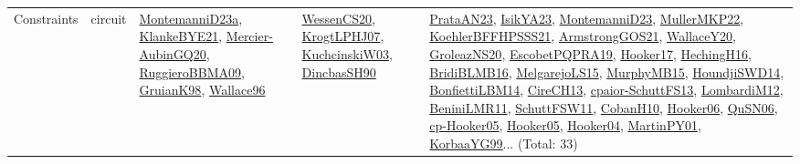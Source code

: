 {\begin{longtable}{lp{3cm}>{\raggedright}p{6cm}>{\raggedright}p{6cm}p{8cm}}
Constraints & circuit & \href{articles/MontemanniD23a.pdf}{MontemanniD23a}\cite{MontemanniD23a}, \href{papers/KlankeBYE21.pdf}{KlankeBYE21}\cite{KlankeBYE21}, \href{papers/Mercier-AubinGQ20.pdf}{Mercier-AubinGQ20}\cite{Mercier-AubinGQ20}, \href{articles/RuggieroBBMA09.pdf}{RuggieroBBMA09}\cite{RuggieroBBMA09}, \href{papers/GruianK98.pdf}{GruianK98}\cite{GruianK98}, \href{articles/Wallace96.pdf}{Wallace96}\cite{Wallace96} & \href{papers/WessenCS20.pdf}{WessenCS20}\cite{WessenCS20}, \href{papers/KrogtLPHJ07.pdf}{KrogtLPHJ07}\cite{KrogtLPHJ07}, \href{articles/KuchcinskiW03.pdf}{KuchcinskiW03}\cite{KuchcinskiW03}, \href{articles/DincbasSH90.pdf}{DincbasSH90}\cite{DincbasSH90} & \href{articles/PrataAN23.pdf}{PrataAN23}\cite{PrataAN23}, \href{articles/IsikYA23.pdf}{IsikYA23}\cite{IsikYA23}, \href{articles/MontemanniD23.pdf}{MontemanniD23}\cite{MontemanniD23}, \href{articles/MullerMKP22.pdf}{MullerMKP22}\cite{MullerMKP22}, \href{articles/KoehlerBFFHPSSS21.pdf}{KoehlerBFFHPSSS21}\cite{KoehlerBFFHPSSS21}, \href{papers/ArmstrongGOS21.pdf}{ArmstrongGOS21}\cite{ArmstrongGOS21}, \href{articles/WallaceY20.pdf}{WallaceY20}\cite{WallaceY20}, \href{papers/GroleazNS20.pdf}{GroleazNS20}\cite{GroleazNS20}, \href{articles/EscobetPQPRA19.pdf}{EscobetPQPRA19}\cite{EscobetPQPRA19}, \href{papers/Hooker17.pdf}{Hooker17}\cite{Hooker17}, \href{papers/HechingH16.pdf}{HechingH16}\cite{HechingH16}, \href{articles/BridiBLMB16.pdf}{BridiBLMB16}\cite{BridiBLMB16}, \href{papers/MelgarejoLS15.pdf}{MelgarejoLS15}\cite{MelgarejoLS15}, \href{papers/MurphyMB15.pdf}{MurphyMB15}\cite{MurphyMB15}, \href{papers/HoundjiSWD14.pdf}{HoundjiSWD14}\cite{HoundjiSWD14}, \href{articles/BonfiettiLBM14.pdf}{BonfiettiLBM14}\cite{BonfiettiLBM14}, \href{papers/CireCH13.pdf}{CireCH13}\cite{CireCH13}, \href{papers/cpaior-SchuttFS13.pdf}{cpaior-SchuttFS13}\cite{cpaior-SchuttFS13}, \href{articles/LombardiM12.pdf}{LombardiM12}\cite{LombardiM12}, \href{articles/BeniniLMR11.pdf}{BeniniLMR11}\cite{BeniniLMR11}, \href{articles/SchuttFSW11.pdf}{SchuttFSW11}\cite{SchuttFSW11}, \href{papers/CobanH10.pdf}{CobanH10}\cite{CobanH10}, \href{articles/Hooker06.pdf}{Hooker06}\cite{Hooker06}, \href{papers/QuSN06.pdf}{QuSN06}\cite{QuSN06}, \href{papers/cp-Hooker05.pdf}{cp-Hooker05}\cite{cp-Hooker05}, \href{articles/Hooker05.pdf}{Hooker05}\cite{Hooker05}, \href{papers/Hooker04.pdf}{Hooker04}\cite{Hooker04}, \href{articles/MartinPY01.pdf}{MartinPY01}\cite{MartinPY01}, \href{papers/KorbaaYG99.pdf}{KorbaaYG99}\cite{KorbaaYG99}... (Total: 33)\\

\end{longtable}}
